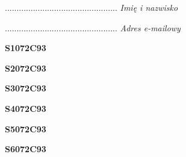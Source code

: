 \begin{turn}{90}\begin{minipage}{\linewidth} \vspace{20mm} ................................................  \textit{Imię i nazwisko}\end{minipage}\end{turn}

\begin{turn}{90}\begin{minipage}{\linewidth} \vspace{20mm} ................................................  \textit{Adres e-mailowy}\end{minipage}\end{turn}

\begin{turn}{90}\huge \begin{minipage}{\linewidth} \vspace{10mm}\textbf{S1072C93}\end{minipage}\end{turn}

\begin{turn}{90}\huge \begin{minipage}{\linewidth} \vspace{10mm}\textbf{S2072C93}\end{minipage}\end{turn}

\begin{turn}{90}\huge \begin{minipage}{\linewidth} \vspace{10mm}\textbf{S3072C93}\end{minipage}\end{turn}

\begin{turn}{90}\huge \begin{minipage}{\linewidth} \vspace{10mm}\textbf{S4072C93}\end{minipage}\end{turn}

\begin{turn}{90}\huge \begin{minipage}{\linewidth} \vspace{10mm}\textbf{S5072C93}\end{minipage}\end{turn}

\begin{turn}{90}\huge \begin{minipage}{\linewidth} \vspace{10mm}\textbf{S6072C93}\end{minipage}\end{turn}

